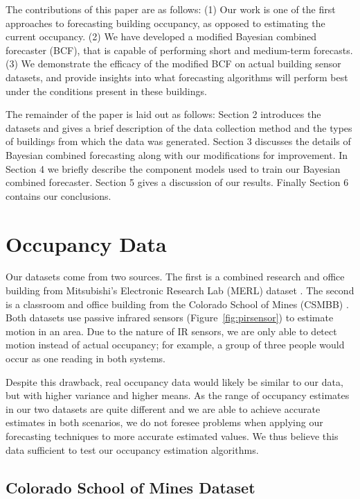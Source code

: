 \documentclass{acm_proc_article-sp}
\begin{document}
The contributions of this paper are as follows: (1) Our work is one of the first approaches to forecasting building occupancy, as opposed to estimating the current occupancy.  (2) We have developed a modified Bayesian combined forecaster (BCF), that is capable of performing short and medium-term forecasts.  (3) We demonstrate the efficacy of the modified BCF on actual building sensor datasets, and provide insights into what forecasting algorithms will perform best under the conditions present in these buildings.  

The remainder of the paper is laid out as follows: Section 2 introduces the datasets and gives a brief description of the data collection method and the types of buildings from which the data was generated.  Section 3 discusses the details of Bayesian combined forecasting along with our modifications for improvement.  In Section 4 we briefly describe the component models used to train our Bayesian combined forecaster.  Section 5 gives a discussion of our results.  Finally Section 6 contains our conclusions.

\section{Occupancy Data}
 
Our datasets come from two sources.  The first is a combined research and office building from Mitsubishi's Electronic Research Lab (MERL) dataset \cite{Wren2007}.  The second is a classroom and office building from the Colorado School of Mines (CSMBB) \cite{Hoff2009}.  Both datasets use passive infrared sensors (Figure~\ref{fig:pirsensor}) to estimate motion in an area.  Due to the nature of IR sensors, we are only able to detect motion instead of actual occupancy; for example, a group of three people would occur as one reading in both systems.  

Despite this drawback, real occupancy data would likely be similar to our data, but with higher variance and higher means.  As the range of occupancy estimates in our two datasets are quite different and we are able to achieve accurate estimates in both scenarios, we do not foresee problems when applying our forecasting techniques to more accurate estimated values.  We thus believe this data sufficient to test our occupancy estimation algorithms.


\subsection{Colorado School of Mines Dataset}
\end{document}
